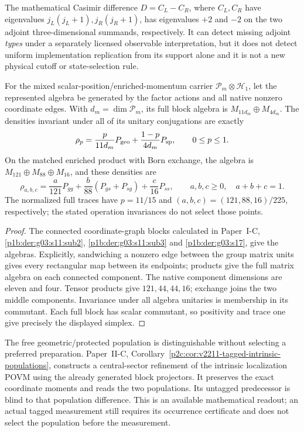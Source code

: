 \documentclass[12pt,a4paper]{article}
\begin{document}
\begin{remark}
\label{p2b:rem:casimir-difference-support-diagnostic}
The mathematical Casimir difference \(D=C_L-C_R\), where \(C_L,C_R\)
have eigenvalues \(j_L(j_L+1),j_R(j_R+1)\), has eigenvalues
\(+2\) and \(-2\) on the two adjoint three-dimensional summands,
respectively.  It can detect missing adjoint \emph{types} under a
separately licensed observable interpretation, but it does not detect
uniform implementation replication from its support alone and it
is not a new physical cutoff or state-selection rule.
\end{remark}

\begin{corollary}
\label{p2b:cor:v233-native-invariant-states}
For the mixed scalar-position/enriched-momentum carrier
\(\mathcal P_m\otimes\mathcal H_1\), let the represented algebra be
generated by the factor actions and all native nonzero coordinate
edges. With \(d_m=\dim\mathcal P_m\), its full block algebra is
\(M_{11d_m}\oplus M_{4d_m}\).
The densities invariant under all of its unitary conjugations are
exactly
\[
 \rho_p=\frac{p}{11d_m}P_{\rm geo}
       +\frac{1-p}{4d_m}P_{\rm sp},\qquad 0\le p\le1.
\]
On the matched enriched product with Born exchange, the algebra is
\(M_{121}\oplus M_{88}\oplus M_{16}\), and these densities are
\[
 \rho_{a,b,c}=\frac a{121}P_{gg}
       +\frac b{88}(P_{gs}+P_{sg})+\frac c{16}P_{ss},
 \qquad a,b,c\ge0,\quad a+b+c=1.
\]
The normalized full traces have \(p=11/15\) and
\((a,b,c)=(121,88,16)/225\), respectively; the stated operation
invariances do not select those points.
\end{corollary}
\begin{proof}
The connected coordinate-graph blocks calculated in Paper~I-C,
\ref{p1b:der:g03:s11:sub2}, \ref{p1b:der:g03:s11:sub3} and
\ref{p1b:der:g03:s17}, give the algebras. Explicitly, sandwiching
a nonzero edge between the group matrix units gives every rectangular
map between its endpoints; products give the full matrix algebra
on each connected component. The native component dimensions are
eleven and four. Tensor products give \(121,44,44,16\);
exchange joins the two middle components.
Invariance under all algebra unitaries is membership in its commutant.
Each full block has scalar commutant, so positivity and trace one
give precisely the displayed simplex.
\end{proof}

The free geometric/protected population is distinguishable without selecting
a preferred preparation.  Paper~II-C,
Corollary~\ref{p2c:cor:v2211-tagged-intrinsic-populations}, constructs a
central-sector refinement of the intrinsic localization POVM using the
already generated block projectors.  It preserves the exact coordinate
moments and reads the two populations.  Its untagged predecessor is blind to
that population difference.  This is an available mathematical readout;
an actual tagged measurement still requires its occurrence certificate and
does not select the population before the measurement.
\end{document}
